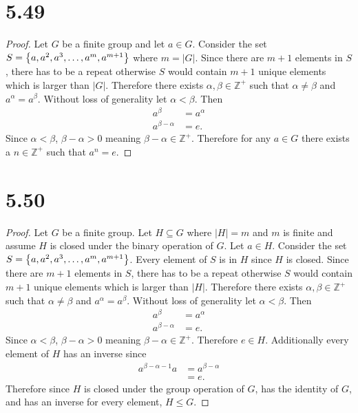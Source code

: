 \documentclass[12pt]{extarticle}
\begin{document}
\section*{5.49}
\begin{proof}
	Let $G$ be a finite group and let $a \in G$. Consider the set $S = \qty{a, a^2, a^3, \ldots, a^m, a^{m+1}}$ where $m = |G|$. Since there are $m+1$ elements in $S$, there has to be a repeat otherwise $S$ would contain $m+1$ unique elements which is larger than $|G|$. Therefore there exists $\alpha, \beta \in \mathbb{Z}^+$ such that $\alpha \neq \beta$ and $a^\alpha = a^\beta$. Without loss of generality let $\alpha < \beta$. Then
	\begin{align*}
		a^\beta &= a^\alpha \\
		a^{\beta - \alpha} &= e
	.\end{align*}
	Since $\alpha < \beta$, $\beta - \alpha > 0$ meaning $\beta - \alpha \in \mathbb{Z}^+$. Therefore for any $a \in G$ there exists a $n \in \mathbb{Z}^+$ such that $a^n = e$.
\end{proof}

\section*{5.50}
\begin{proof}
	Let $G$ be a finite group. Let $H \subseteq G$ where $|H| = m$ and $m$ is finite and assume $H$ is closed under the binary operation of $G$. Let $a \in H$. Consider the set $S = \qty{a, a^2, a^3, \ldots, a^m, a^{m+1}}$. Every element of $S$ is in $H$ since $H$ is closed. Since there are $m+1$ elements in $S$, there has to be a repeat otherwise $S$ would contain $m+1$ unique elements which is larger than $|H|$. Therefore there exists $\alpha, \beta \in \mathbb{Z}^+$ such that $\alpha \neq \beta$ and $a^\alpha = a^\beta$. Without loss of generality let $\alpha < \beta$. Then
	\begin{align*}
		a^\beta &= a^\alpha \\
		a^{\beta - \alpha} &= e
	.\end{align*}
	Since $\alpha < \beta$, $\beta - \alpha > 0$ meaning $\beta - \alpha \in \mathbb{Z}^+$. Therefore $e \in H$. Additionally every element of $H$ has an inverse since
	\begin{align*}
		a^{\beta - \alpha - 1} a &= a^{\beta - \alpha} \\
														 &= e
	.\end{align*}
	Therefore since $H$ is closed under the group operation of $G$, has the identity of $G$, and has an inverse for every element, $H \leq G$.
\end{proof}
\end{document}

